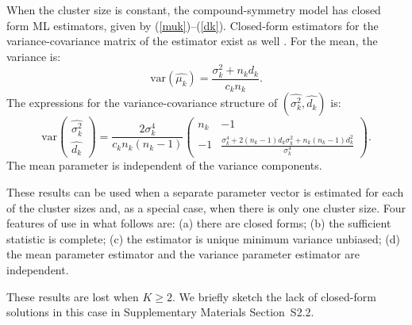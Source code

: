 \documentclass[11pt,a5paper,twoside]{book}
\begin{document}
When the cluster size is constant, the compound-symmetry model has closed form ML estimators, given by (\ref{muk})--(\ref{dk}). Closed-form estimators for the variance-covariance matrix of the estimator exist as well \citep{Iddi2011}. For the mean, the variance is:
\begin{equation}
\label{varexprmuk}
\mbox{var}(\widehat{\mu_k})=\frac{\sigma_k^2+n_kd_k}{c_kn_k}.
\end{equation}
The expressions for the variance-covariance structure of $(\widehat{\sigma^2_k},\widehat{d_k})$ is:
\begin{equation}
\label{varexprsigmakdk}
\mbox{var}\left(\begin{array}{c}\widehat{\sigma^2_k}\\ \widehat{d_k}\end{array}\right)=
\frac{2\sigma^4_k}{c_kn_k(n_k-1)}
\left(
\begin{array}{cc}
n_k&-1\\
-1&\frac{\sigma_k^4+2(n_k-1)d_k\sigma_k^2+n_k(n_k-1)d^2_k}{\sigma_k^4}
\end{array}
\right).
\end{equation}
The mean parameter is independent of the variance components.

These results can be used when a separate parameter vector is estimated for each of the cluster sizes and, as a special case,  when there is only one cluster size. Four features of use in what follows are: (a) there are closed forms; (b) the sufficient statistic is complete; (c) the estimator is unique minimum variance unbiased; (d) the mean parameter estimator and the variance parameter estimator are independent.

These results are lost when $K\ge 2$. We briefly sketch the lack of closed-form solutions in this case in Supplementary Materials Section~S2.2.
\end{document}
